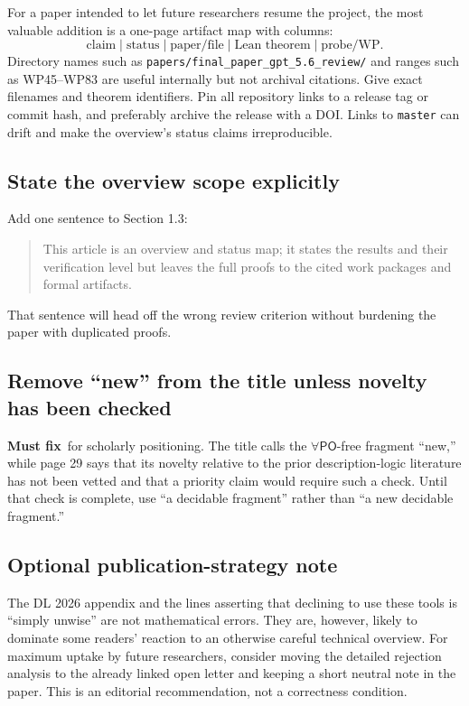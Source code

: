 \documentclass[11pt]{article}
\newcommand{\PO}{\ensuremath{\mathsf{PO}}}
\newcommand{\mustfix}{\textcolor{reviewred}{\textbf{Must fix}}}
\newcommand{\code}[1]{\texttt{#1}}
\begin{document}
For a paper intended to let future researchers resume the project, the most valuable addition is a one-page artifact map with columns:
\[
\text{claim} \mid \text{status} \mid \text{paper/file} \mid \text{Lean theorem} \mid \text{probe/WP}.
\]
Directory names such as \code{papers/final\_paper\_gpt\_5.6\_review/} and ranges such as WP45--WP83 are useful internally but not archival citations. Give exact filenames and theorem identifiers. Pin all repository links to a release tag or commit hash, and preferably archive the release with a DOI. Links to \code{master} can drift and make the overview's status claims irreproducible.

\subsection{State the overview scope explicitly}

Add one sentence to Section 1.3:
\begin{quote}
This article is an overview and status map; it states the results and their verification level but leaves the full proofs to the cited work packages and formal artifacts.
\end{quote}
That sentence will head off the wrong review criterion without burdening the paper with duplicated proofs.

\subsection{Remove ``new'' from the title unless novelty has been checked}

\mustfix\ for scholarly positioning. The title calls the \(\forall\PO\)-free fragment ``new,'' while page 29 says that its novelty relative to the prior description-logic literature has not been vetted and that a priority claim would require such a check. Until that check is complete, use ``a decidable fragment'' rather than ``a new decidable fragment.''

\subsection{Optional publication-strategy note}

The DL 2026 appendix and the lines asserting that declining to use these tools is ``simply unwise'' are not mathematical errors. They are, however, likely to dominate some readers' reaction to an otherwise careful technical overview. For maximum uptake by future researchers, consider moving the detailed rejection analysis to the already linked open letter and keeping a short neutral note in the paper. This is an editorial recommendation, not a correctness condition.
\end{document}
